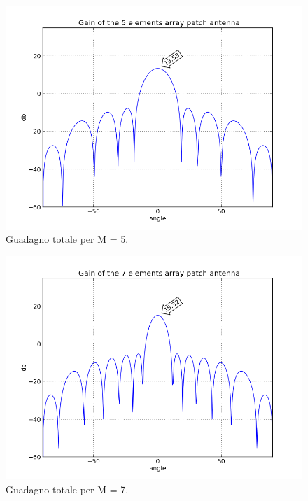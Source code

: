 \begin{figure}
\centering
\caption{Guadagno totale per M = 5.}
\label{img:gain5}
\includegraphics[scale=0.5]{Immagini/gain5}
\end{figure}
\begin{figure}
\centering
\caption{Guadagno totale per M = 7.}
\label{img:gain7}
\includegraphics[scale=0.5]{Immagini/gain7}
\end{figure}
